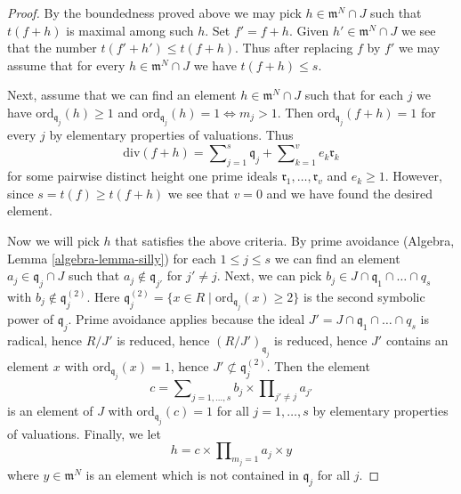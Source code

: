 \begin{proof}
\medskip\noindent
By the boundedness proved above we may pick $h \in \mathfrak m^N \cap J$
such that $t(f + h)$ is maximal among such $h$. Set $f' = f + h$.
Given $h' \in \mathfrak m^N \cap J$
we see that the number $t(f' + h') \leq t(f + h)$.
Thus after replacing $f$ by $f'$ we may assume that for every
$h \in \mathfrak m^N \cap J$ we have $t(f + h) \leq s$.

\medskip\noindent
Next, assume that we can find an element $h \in \mathfrak m^N \cap J$
such that for each $j$ we have $\text{ord}_{\mathfrak q_j}(h) \geq 1$ and
$\text{ord}_{\mathfrak q_j}(h) = 1 \Leftrightarrow m_j > 1$.
Then $\text{ord}_{\mathfrak q_j}(f + h) = 1$
for every $j$ by elementary properties of valuations.
Thus
$$
\text{div}(f + h) = \sum\nolimits_{j = 1}^s \mathfrak q_j +
\sum\nolimits_{k = 1}^v e_k \mathfrak r_k
$$
for some pairwise distinct height one prime ideals
$\mathfrak r_1, \ldots, \mathfrak r_v$ and $e_k \geq 1$.
However, since $s = t(f) \geq t(f + h)$ we see that $v = 0$
and we have found the desired element.

\medskip\noindent
Now we will pick $h$ that satisfies the above criteria.
By prime avoidance (Algebra, Lemma \ref{algebra-lemma-silly})
for each $1 \leq j \leq s$ we can find an element
$a_j \in \mathfrak q_j \cap J$
such that $a_j \not \in \mathfrak q_{j'}$ for $j' \not = j$.
Next, we can pick $b_j \in J \cap \mathfrak q_1 \cap \ldots \cap q_s$
with $b_j \not \in \mathfrak q_j^{(2)}$. Here
$\mathfrak q_j^{(2)} = \{x \in R \mid \text{ord}_{\mathfrak q_j}(x) \geq 2\}$
is the second symbolic power of $\mathfrak q_j$.
Prime avoidance applies because the ideal
$J' = J \cap \mathfrak q_1 \cap \ldots \cap q_s$
is radical, hence $R/J'$ is reduced, hence $(R/J')_{\mathfrak q_j}$
is reduced, hence $J'$ contains an element $x$ with
$\text{ord}_{\mathfrak q_j}(x) = 1$, hence
$J' \not \subset \mathfrak q_j^{(2)}$. Then the element
$$
c = \sum\nolimits_{j = 1, \ldots, s}
b_j \times \prod\nolimits_{j' \not = j} a_{j'}
$$
is an element of $J$
with $\text{ord}_{\mathfrak q_j}(c) = 1$ for all $j = 1, \ldots, s$
by elementary properties of valuations. Finally, we let
$$
h = c \times \prod\nolimits_{m_j = 1} a_j \times y
$$
where $y \in \mathfrak m^N$ is an element
which is not contained in $\mathfrak q_j$ for all $j$.
\end{proof}












